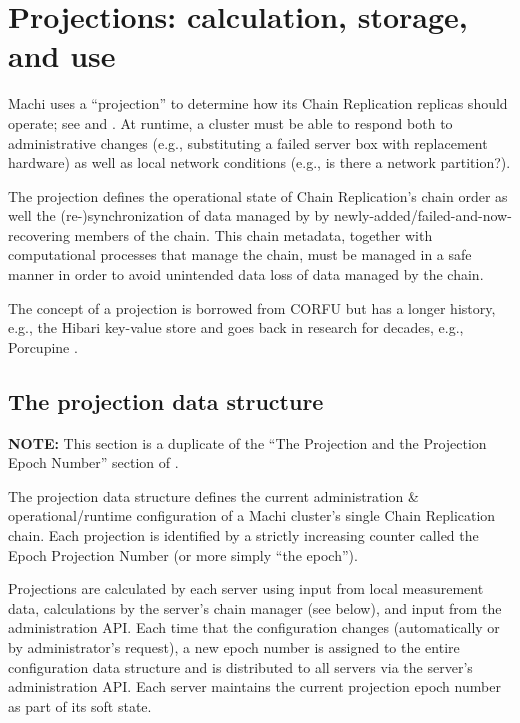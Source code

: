 \documentclass[preprint,10pt]{sigplanconf}
\begin{document}
\section{Projections: calculation, storage, and use}
\label{sec:projections}

Machi uses a ``projection'' to determine how its Chain Replication replicas
should operate; see \cite{machi-design} and
\cite{corfu1}.  At runtime, a cluster must be able to respond both to
administrative changes (e.g., substituting a failed server box with
replacement hardware) as well as local network conditions (e.g., is
there a network partition?).

The projection defines the operational state of Chain Replication's
chain order as well the (re-)synchronization of data managed by by
newly-added/failed-and-now-recovering members of the chain.  This
chain metadata, together with computational processes that manage the
chain, must be managed in a safe manner in order to avoid unintended
data loss of data managed by the chain.

The concept of a projection is borrowed
from CORFU but has a longer history, e.g., the Hibari key-value store
\cite{cr-theory-and-practice} and goes back in research for decades,
e.g., Porcupine \cite{porcupine}.

\subsection{The projection data structure}
\label{sub:the-projection}

{\bf NOTE:} This section is a duplicate of the ``The Projection and
the Projection Epoch Number'' section of \cite{machi-design}.

The projection data
structure defines the current administration \& operational/runtime
configuration of a Machi cluster's single Chain Replication chain.
Each projection is identified by a strictly increasing counter called
the Epoch Projection Number (or more simply ``the epoch'').

Projections are calculated by each server using input from local
measurement data, calculations by the server's chain manager
(see below), and input from the administration API.
Each time that the configuration changes (automatically or by
administrator's request), a new epoch number is assigned
to the entire configuration data structure and is distributed to
all servers via the server's administration API.  Each server maintains the
current projection epoch number as part of its soft state.
\end{document}
